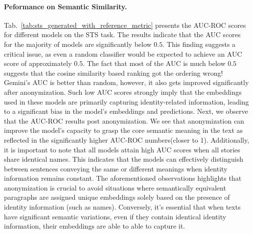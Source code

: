\paragraph{Peformance on Semantic Similarity.}
 Tab.~\ref{tab:sts_generated_with_reference_metric} presents the AUC-ROC scores for different models on the STS task. The  results indicate that the AUC scores for the majority of models are significantly below $0.5$. This finding suggests a critical issue, as even a random classifier would be expected to achieve an AUC score of approximately $0.5$. The fact that most of the AUC is much below $0.5$ suggests that the cosine similarity based ranking got the ordering wrong! 
 Gemini's AUC is better than random, however, it also gets improved significantly after anonymization. Such low AUC scores strongly imply that the embeddings used in these models are primarily capturing identity-related information, leading to a significant bias in the model's embeddings and predictions. Next, we observe that the AUC-ROC results post anonymization. We see that anonymization can improve the model's capacity to grasp the core semantic meaning in the text as reflected in the significantly higher AUC-ROC numbers(closer to 1). Additionally, it is important to note that all models attain high AUC scores when all stories share identical names.  This indicates that the models can effectively distinguish between sentences conveying the same or different meanings when identity information remains constant. The aforementioned observations highlights that anonymization is crucial to avoid situations where semantically equivalent paragraphs are assigned unique embeddings solely based on the presence of identity information (such as names). Conversely, it's essential that when texts have significant semantic variations, even if they contain identical identity information, their embeddings are able to able to capture it.

